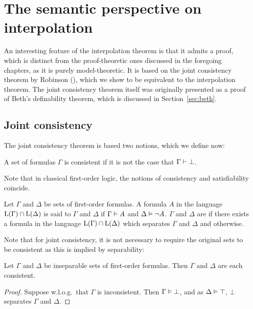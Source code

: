 
\chapter{The semantic perspective on interpolation}
\label{chap:semantic}

An interesting feature of the interpolation theorem is that it admits a proof, which is distinct from the proof-theoretic ones discussed in the foregoing chapters, as it is purely model-theoretic.
It is based on the joint consistency theorem by Robinson (\cite{robinson1956result}), which we show to be equivalent to the interpolation theorem.
The joint consistency theorem itself was originally presented as a proof of Beth's definability theorem, which is discussed in Section~\ref{sec:beth}.

\section{Joint consistency}
\label{sec:joint_consistency}

The joint consistency theorem is based two notions, which we define now:

\begin{defi}[Consistency]
	A set of formulas $\Gamma$ is consistent if it is not the case that $\Gamma \vdash \bot$.
\end{defi}

Note that in classical first-order logic, the notions of consistency and satisfiability coincide.

\begin{defi}[Separability]
	Let $\Gamma$ and $\Delta$ be sets of first-order formulas.
	A formula $A$ in the language $\operatorname{L}(\Gamma)\cap \operatorname{L}(\Delta)$ is said to  $\Gamma$ and $\Delta$ if $\Gamma \vDash A$ and $\Delta \vDash \lnot A$.
	$\Gamma$ and $\Delta$ are  if there exists a formula in the language $\operatorname{L}(\Gamma)\cap \operatorname{L}(\Delta)$ which separates $\Gamma$ and $\Delta$ and  otherwise.
\end{defi}

Note that for joint consistency, it is not necessary to require the original sets to be consistent as this is implied by separability:

\begin{lemma}
	\label{lemma:insep_consistent}
	Let $\Gamma$ and $\Delta$ be inseparable sets of first-order formulas. Then $\Gamma$ and $\Delta$ are each consistent.
\end{lemma}
\begin{proof}
	Suppose w.l.o.g.\ that $\Gamma$ is inconsistent. Then $\Gamma \vDash \bot$, and as $\Delta \vDash \top$, $\bot$ separates $\Gamma$ and $\Delta$.
\end{proof}

